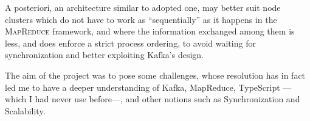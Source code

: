A posteriori, an architecture similar to adopted one, may better suit node clusters which do not have to work as ``sequentially'' as it happens in the \textsc{MapReduce} framework, and where the information exchanged among them is less, and does enforce a strict process ordering, to avoid waiting for synchronization and better exploiting Kafka's design.

The aim of the project was to pose some challenges, whose resolution has in fact led me to have a deeper understanding of Kafka, MapReduce, TypeScript ---which I had never use before---, and other notions such as Synchronization and Scalability. 